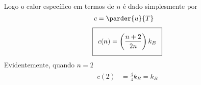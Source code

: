 \begin{prob}
\begin{sol}
\begin{enumerate}[label=\alph *)]
\begin{align}
      \end{align}
      Logo o calor específico em termos de $n$ é dado simplesmente por
      \begin{align}
        c&=\parder{u}{T}
      \end{align}
      \begin{align}
        \addtolength{\fboxsep}{5pt}
        \boxed{
          \begin{gathered}
            c(n)=\left(\frac{n+2}{2n}\right)k_B
          \end{gathered}
        }
      \end{align}
      Evidentemente, quando $n=2$
      \begin{align}
        \begin{split}
          c(2)&=\frac{4}{4}k_B=k_B
        \end{split}
      \end{align} 
    \end{enumerate}
  \end{sol}
\end{prob}
